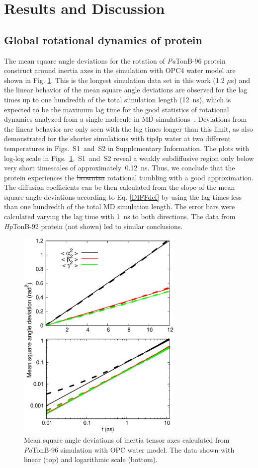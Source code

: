 \documentclass[journal=jpcbfk,manuscript=article]{achemso}
\providecommand{\DIFadd}[1]{{\protect\color{blue}\uwave{#1}}} %
\providecommand{\DIFdel}[1]{{\protect\color{red}\sout{#1}}}                      %
\providecommand{\DIFaddbegin}{} %
\providecommand{\DIFaddend}{} %
\providecommand{\DIFdelbegin}{} %
\providecommand{\DIFdelend}{} %
\begin{document}
\section{Results and Discussion}

\subsection{Global rotational dynamics of protein}

The mean square angle deviations for the rotation of {\it Pa}TonB-96 protein construct
around inertia axes in the simulation with OPC4 water model
are shown in Fig. \ref{RMASDplot}. This is the longest
simulation data set in this work (1.2 $\mu$s) and the
linear behavior of the mean square angle deviations are observed
for the lag times up to one hundredth of the total simulation length (12~ns),
which is expected to be the maximum lag time for the good statistics
of rotational dynamics analyzed from a single molecule in MD simulations~\cite{lu06}.
Deviations from the linear behavior are only seen with the lag times longer
than this limit, as also demonstrated for the shorter simulations
with tip4p water at two different temperatures
in Figs.~S1~and~S2 in Supplementary Information.
The plots with log-log scale in
Figs.~\ref{RMASDplot},~S1~and~S2
reveal a weakly subdiffusive region only below very short timescales
of approximately~0.12~ns. Thus, we conclude that the protein
experiences the \DIFdelbegin \DIFdel{brownian }\DIFdelend \DIFaddbegin \DIFadd{Brownian }\DIFaddend rotational tumbling with  a good approximation.
The diffusion coefficients can be then calculated from the slope of the mean square angle
deviations according to Eq. \ref{DIFFdef} by using the lag times less than
one hundredth of the total MD simulation length.
The error bars were calculated varying the lag time with 1~ns to both directions.
The data from {\it Hp}TonB-92 protein (not shown) led to similar conclusions.
\begin{figure}[htb]
  \includegraphics[width=8.0cm]{../Figs/RMASDplotPsTonBOPC4.eps}%
  \caption{Mean square angle deviations of inertia tensor axes calculated from
    {\it Pa}TonB-96 simulation with OPC water model. The data shown with linear (top) and logarithmic scale (bottom).
    \label{RMASDplot}}%
\end{figure}
\end{document}
